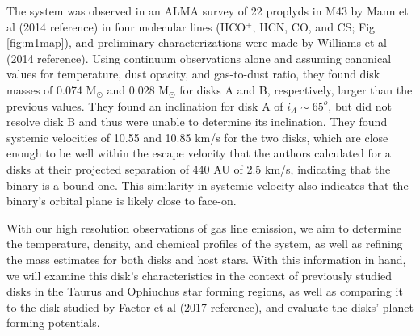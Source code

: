 The system was observed in an ALMA survey of 22 proplyds in M43 by Mann et al (2014 reference) in four molecular lines (HCO$^+$, HCN, CO, and CS; Fig \ref{fig:m1map}), and preliminary characterizations were made by Williams et al (2014 reference). Using continuum observations alone and assuming canonical values for temperature, dust opacity, and gas-to-dust ratio, they found disk masses of 0.074 M$_{\odot}$ and 0.028 M$_{\odot}$ for disks A and B, respectively, larger than the previous values. They found an inclination for disk A of $i_A \sim 65^o$, but did not resolve disk B and thus were unable to determine its inclination. They found systemic velocities of 10.55 and 10.85 km/s for the two disks, which are close enough to be well within the escape velocity that the authors calculated for a disks at their projected separation of 440 AU of 2.5 km/s, indicating that the binary is a bound one. This similarity in systemic velocity also indicates that the binary's orbital plane is likely close to face-on.


With our high resolution observations of gas line emission, we aim to determine the temperature, density, and chemical profiles of the system, as well as refining the mass estimates for both disks and host stars. With this information in hand, we will examine this disk's characteristics in the context of previously studied disks in the Taurus and Ophiuchus star forming regions, as well as comparing it to the disk studied by Factor et al (2017 reference), and evaluate the disks' planet forming potentials.








